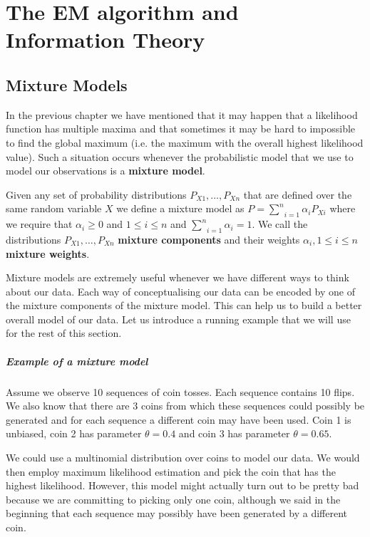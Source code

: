 \chapter{The EM algorithm and Information Theory}

\section{Mixture Models}\label{sec:mixtureModels}

In the previous chapter we have mentioned that it may happen that a likelihood function has multiple 
maxima and that sometimes it may be hard to impossible to find the global maximum (i.e. the maximum
with the overall highest likelihood value). Such a situation occurs whenever the probabilistic model
that we use to model our observations is a \textbf{mixture model}.

\begin{Definition}\label{def:mixtureModel}
Given any set of probability distributions $ P_{X1}, \ldots, P_{Xn} $ that are defined over the same
random variable $ X $ we define a mixture model as
$ P = \underset{i=1}{\overset{n}{\sum}} \alpha_{i}P_{Xi} $
where we require that $ \alpha_{i} \geq 0 $ and $ 1 \leq i \leq n $ and 
$ \underset{i=1}{\overset{n}{\sum}} \alpha_{i} = 1 $.
We call the distributions $ P_{X1}, \ldots, P_{Xn} $ \textbf{mixture components} and their weights
$ \alpha_{i}, 1 \leq i \leq n $ \textbf{mixture weights}.
\end{Definition}

Mixture models are extremely useful whenever we have different ways to think about our data. Each way
of conceptualising our data can be encoded by one of the mixture components of the mixture model.
This can help us to build a better overall model of our data. Let us introduce a running example that
we will use for the rest of this section. 

\paragraph{Example of a mixture model} Assume we observe 10 sequences of coin tosses. Each sequence
contains 10 flips. We also know that there are 3 coins from which these sequences could possibly be
generated and for each sequence a different coin may have been used. Coin 1 is unbiased, coin 2 has
parameter $ \theta = 0.4 $ and coin 3 has parameter $ \theta = 0.65 $. 
 
We could use 
a multinomial distribution over coins to model our data. We would then employ maximum likelihood estimation 
and pick the coin that has the highest likelihood. However, this model might actually turn out to be
pretty bad because we are committing to picking only one coin, although we said in the beginning that
each sequence may possibly have been generated by a different coin. 

